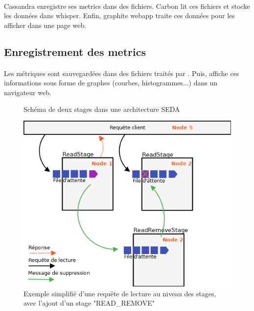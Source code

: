 \documentclass[12pt]{article}
\begin{document}
\paragraph{} Cassandra enregistre ses metrics dans des fichiers.
Carbon lit ces fichiers et stocke les données dans whisper.
Enfin, graphite webapp traite ces données pour les afficher dans une page web.

\subsection{Enregistrement des metrics}







\paragraph{} Les métriques sont sauvegardées dans des fichiers traités par . 
Puis,  affiche ces informations sous forme de graphes (courbes, histogrammes...) dans un navigateur web.

\newpage



\begin{figure}[p]
	\centering
		
	\caption{Schéma de deux stages dans une architecture SEDA \label{fig:stages}}
\end{figure}

\begin{figure}[p]
	\centering
		\includegraphics[width=15cm]{schemas/read_request.png}
	\caption{Exemple simplifié d'une requête de lecture au niveau des stages, avec l'ajout d'un stage "READ\_REMOVE" \label{fig:read_request}}
\end{figure}
\end{document}
